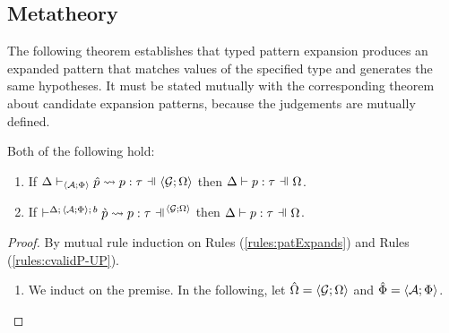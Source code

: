 {{{{\subsection{Metatheory}
The following theorem establishes that typed pattern expansion produces an expanded pattern that matches values of the specified type and generates the same hypotheses. It must be stated mutually with the corresponding theorem about candidate expansion patterns, because the judgements are mutually defined.
\begin{theorem}\label{thm:typed-pattern-expansion} Both of the following hold:
\begin{enumerate}
  \item If $\patExpands{\uGG{\uG}{\pctx}}{\uAP{\uA}{\Phi}}{\upv}{p}{\tau}$ then $\patType{\pctx}{p}{\tau}$.
  \item If $\cvalidP{\uGG{\uG}{\pctx}}{\pscene{\Delta}{\uAP{\uA}{\Phi}}{b}}{\cpv}{p}{\tau}$ then $\patType{\pctx}{p}{\tau}$.
\end{enumerate}
\end{theorem}
\begin{proof}
  By mutual rule induction on Rules (\ref{rules:patExpands}) and Rules (\ref{rules:cvalidP-UP}).
  \begin{enumerate}
  \item We induct on the premise. In the following, let $\hat\Omega=\langle \mathcal{G}; \Omega \rangle$ and $\hat\Phi=\langle \mathcal{A}; \Phi \rangle$.
\end{enumerate}
\end{proof}}}}}
